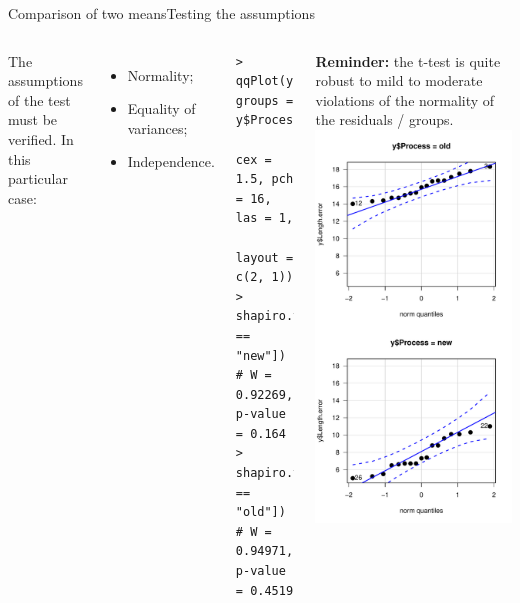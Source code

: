 \begin{frame}[fragile]{Comparison of two means}{Testing the assumptions}


\begin{columns}[T]

  The assumptions of the test must be verified. In this particular case:


  {\smaller
\begin{itemize}
  \item \alert{Normality};
  \item Equality of variances;
  \item Independence.
\end{itemize}

{\smaller
\begin{verbatim}
> qqPlot(y$Length.error, groups = y$Process,
        cex = 1.5, pch = 16,  las = 1,
        layout = c(2, 1))
> shapiro.test(y$Length.error[y$Process == "new"])
# W = 0.92269, p-value = 0.164
> shapiro.test(y$Length.error[y$Process == "old"])
# W = 0.94971, p-value = 0.4519
\end{verbatim}}}

{\bf Reminder:} the t-test is quite robust to mild to moderate violations of the normality of the residuals / groups.
\includegraphics[width=.7\textwidth]{../img/steelrodsqq.pdf}
\end{columns}
\end{frame}

